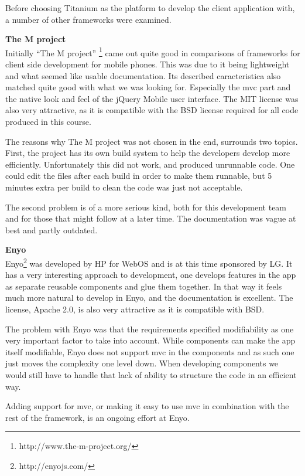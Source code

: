 \documentclass[11pt]{book}
\begin{document}
Before choosing Titanium as the platform to develop the client application with, a number of other frameworks were examined.

\textbf{The M project}\\
Initially “The M project” \footnote{http://www.the-m-project.org/} came out quite good in comparisons of frameworks for client side development for mobile phones. This was due to it being lightweight and what seemed like usable documentation. Its described caracteristica also matched quite good with what we was looking for. Especially the \gls{mvc} part and the native look and feel of the jQuery Mobile user interface. The MIT license was also very attractive, as it is compatible with the BSD license required for all code produced in this course.

The reasons why The M project was not chosen in the end, surrounds two topics. First, the project has its own build system to help the developers develop more efficiently. Unfortunately this did not work, and produced unrunnable code. One could edit the files after each build in order to make them runnable, but 5 minutes extra per build to clean the code was just not acceptable.

The second problem is of a more serious kind, both for this development team and for those that might follow at a later time. The documentation was vague at best and partly outdated.

\textbf{Enyo}\\
Enyo\footnote{http://enyojs.com/} was developed by HP for WebOS\cite{enyoHistory} and is at this time sponsored by LG. It has a very interesting approach to development, one develops features in the app as separate reusable components and glue them together. In that way it feels much more natural to develop in Enyo, and the documentation is excellent. The license, Apache 2.0, is also very attractive as it is compatible with BSD.

The problem with Enyo was that the requirements specified modifiability as one very important factor to take into account. While components can make the app itself modifiable, Enyo does not support \gls{mvc} in the components and as such one just moves the complexity one level down. When developing components we would still have to handle that lack of ability to structure the code in an efficient way.

Adding support for \gls{mvc}, or making it easy to use \gls{mvc} in combination with the rest of the framework, is an ongoing effort at Enyo.
\end{document}
